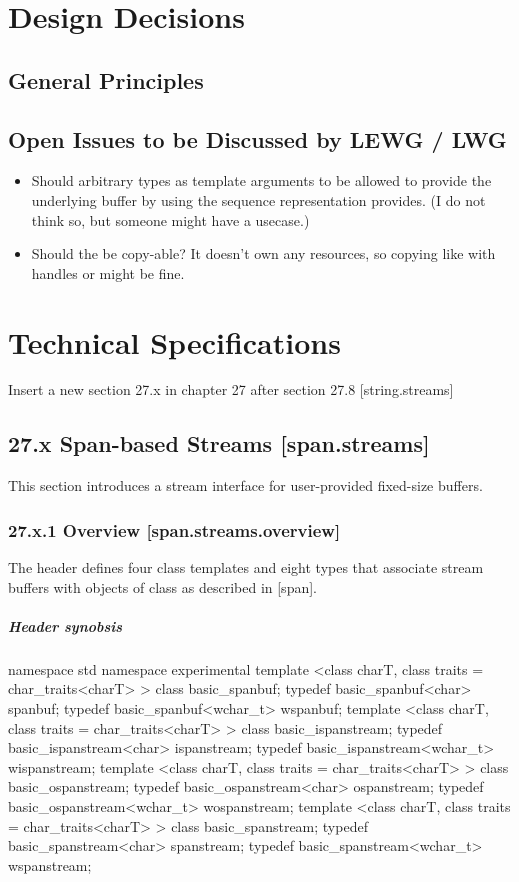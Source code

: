 \documentclass[ebook,11pt,article]{memoir}
\begin{document}
\chapter{Design Decisions}
\section{General Principles}
\section{Open Issues to be Discussed by LEWG / LWG}
\begin{itemize}
\item Should arbitrary types as template arguments to  be allowed to provide the underlying buffer by using the  sequence representation  provides. (I do not think so, but someone might have a usecase.)
\item Should the  be copy-able? It doesn't own any resources, so copying like with handles or  might be fine.
\end{itemize}

\chapter{Technical Specifications}
Insert a new section 27.x in chapter 27 after section 27.8 [string.streams]

\section{27.x Span-based Streams [span.streams]}
This section introduces a stream interface for user-provided fixed-size buffers. 
\subsection{27.x.1 Overview [span.streams.overview]}
The header  defines four class templates and eight types that associate stream buffers with objects of class  as described in [span].

\paragraph{Header  synobsis}

\begin{codeblock}
namespace std {
namespace experimental {
  template <class charT, class traits = char_traits<charT> >
    class basic_spanbuf;
  typedef basic_spanbuf<char>     spanbuf;
  typedef basic_spanbuf<wchar_t> wspanbuf;
  template <class charT, class traits = char_traits<charT> >
    class basic_ispanstream;
  typedef basic_ispanstream<char>     ispanstream;
  typedef basic_ispanstream<wchar_t> wispanstream;
  template <class charT, class traits = char_traits<charT> >
    class basic_ospanstream;
  typedef basic_ospanstream<char>     ospanstream;
  typedef basic_ospanstream<wchar_t> wospanstream;
  template <class charT, class traits = char_traits<charT> >
    class basic_spanstream;
  typedef basic_spanstream<char>     spanstream;
  typedef basic_spanstream<wchar_t> wspanstream;
}}
\end{codeblock}
\end{document}
